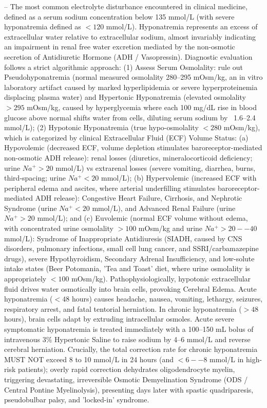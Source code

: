 -- The most common electrolyte disturbance encountered in clinical medicine, defined as a serum sodium concentration below 135 mmol/L (with severe hyponatremia defined as $<120$ mmol/L). Hyponatremia represents an excess of extracellular water relative to extracellular sodium, almost invariably indicating an impairment in renal free water excretion mediated by the non-osmotic secretion of Antidiuretic Hormone (ADH / Vasopressin). Diagnostic evaluation follows a strict algorithmic approach: (1) Assess Serum Osmolality: rule out Pseudohyponatremia (normal measured osmolality 280--295 mOsm/kg, an in vitro laboratory artifact caused by marked hyperlipidemia or severe hyperproteinemia displacing plasma water) and Hypertonic Hyponatremia (elevated osmolality $>295$ mOsm/kg, caused by hyperglycemia where each 100 mg/dL rise in blood glucose above normal shifts water from cells, diluting serum sodium by ~1.6--2.4 mmol/L); (2) Hypotonic Hyponatremia (true hypo-osmolality $<280$ mOsm/kg), which is categorized by clinical Extracellular Fluid (ECF) Volume Status: (a) Hypovolemic (decreased ECF, volume depletion stimulates baroreceptor-mediated non-osmotic ADH release): renal losses (diuretics, mineralocorticoid deficiency; urine $Na^+ > 20$ mmol/L) vs extrarenal losses (severe vomiting, diarrhea, burns, third-spacing; urine $Na^+ < 20$ mmol/L); (b) Hypervolemic (increased ECF with peripheral edema and ascites, where arterial underfilling stimulates baroreceptor-mediated ADH release): Congestive Heart Failure, Cirrhosis, and Nephrotic Syndrome (urine $Na^+ < 20$ mmol/L), and Advanced Renal Failure (urine $Na^+ > 20$ mmol/L); and (c) Euvolemic (normal ECF volume without edema, with concentrated urine osmolality $>100$ mOsm/kg and urine $Na^+ > 20--40$ mmol/L): Syndrome of Inappropriate Antidiuresis (SIADH, caused by CNS disorders, pulmonary infections, small cell lung cancer, and SSRI/carbamazepine drugs), severe Hypothyroidism, Secondary Adrenal Insufficiency, and low-solute intake states (Beer Potomania, 'Tea and Toast' diet, where urine osmolality is appropriately $<100$ mOsm/kg). Pathophysiologically, hypotonic extracellular fluid drives water osmotically into brain cells, provoking Cerebral Edema. Acute hyponatremia ($<48$ hours) causes headache, nausea, vomiting, lethargy, seizures, respiratory arrest, and fatal tentorial herniation. In chronic hyponatremia ($>48$ hours), brain cells adapt by extruding intracellular osmoles. Acute severe symptomatic hyponatremia is treated immediately with a 100--150 mL bolus of intravenous 3\% Hypertonic Saline to raise sodium by 4--6 mmol/L and reverse cerebral herniation. Crucially, the total correction rate for chronic hyponatremia MUST NOT exceed 8 to 10 mmol/L in 24 hours (and $<6--8$ mmol/L in high-risk patients); overly rapid correction dehydrates oligodendrocyte myelin, triggering devastating, irreversible Osmotic Demyelination Syndrome (ODS / Central Pontine Myelinolysis), presenting days later with spastic quadriparesis, pseudobulbar palsy, and 'locked-in' syndrome.


